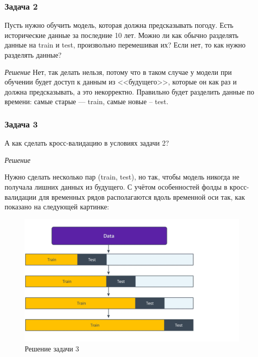\subsubsection{Задача 2}

Пусть нужно обучить модель, которая должна предсказывать погоду. Есть исторические данные за последние 10 лет. Можно ли как обычно разделять данные на train и test, произвольно перемешивая их? Если нет, то как нужно разделять данные?

\textit{Решение}
Нет, так делать нельзя, потому что в таком случае у модели при обучении будет доступ к данным из <<будущего>>, которые он как раз и должна предсказывать, а это некорректно. Правильно будет разделить данные по времени: самые старые --- train, самые новые -- test.

\subsubsection{Задача 3}

А как сделать кросс-валидацию в условиях задачи 2?

\textit{Решение}

Нужно сделать несколько пар (train, test), но так, чтобы модель никогда не получала лишних данных из будущего. С учётом особенностей фолды в кросс-валидации для временных рядов располагаются вдоль временной оси так, как показано на следующей картинке:

\begin{figure}[h]
	\centering
	\includegraphics[width=\textwidth/2]{sol-3.png}
	\caption{Решение задачи 3}
	\label{img:sol-3}
\end{figure}
